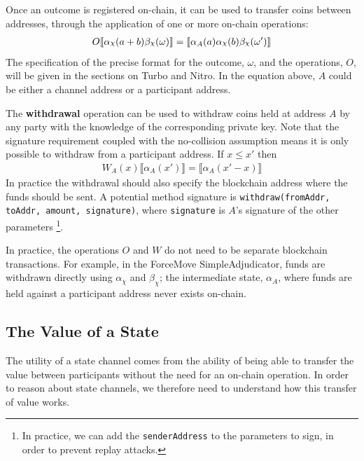 \documentclass{article}
\DeclareRobustCommand{\rchi}{{\mathpalette\irchi\relax}}
\newcommand{\irchi}[2]{\raisebox{\depth}{$#1\chi$}} %
\theoremstyle{definition}
\newcommand{\adj}[1]{\llbracket #1 \rrbracket}
\begin{document}
Once an outcome is registered on-chain, it can be used to transfer coins between addresses,
through the application of one or more on-chain operations:
\begin{align*}
O \adj{\alpha_\rchi(a + b)\beta_\rchi(\omega)} = \adj{\alpha_A(a)\alpha_\rchi(b)\beta_\rchi(\omega')}
\end{align*} 
The specification of the precise format for the outcome, $\omega$, and the operations, $O$,
will be given in the sections on Turbo and Nitro.
In the equation above, $A$ could be either a channel address or a participant address.

The \textbf{withdrawal} operation can be used to withdraw coins held at address $A$ by any
party with the knowledge of the corresponding private key. 
Note that the signature requirement coupled with the no-collision assumption means
it is only possible to withdraw from a participant address.
If $x \leq x'$ then
\begin{align*}
W_A(x) \adj{\alpha_A(x')} = \adj{\alpha_A(x'-x)}
\end{align*}
In practice the withdrawal should also specify the blockchain address where the funds should be sent.
A potential method signature is \texttt{withdraw(fromAddr, toAddr, amount, signature)}, 
where \texttt{signature} is $A$'s signature of the other parameters
\footnote{In practice, we can add the \texttt{senderAddress} to the parameters to sign,
in order to prevent replay attacks.}.

In practice, the operations $O$ and $W$ do not need to be separate blockchain transactions.
For example, in the ForceMove SimpleAdjudicator, funds are withdrawn directly using $\alpha_\chi$ and $\beta_\chi$;
the intermediate state, $\alpha_A$, where funds are held against a participant address never exists on-chain.

\subsection{The Value of a State}\label{section:value-of-a-state}

The utility of a state channel comes from the ability of being able to transfer the value
between participants without the need for an on-chain operation.
In order to reason about state channels, we therefore need to understand how this transfer
of value works.
\end{document}
